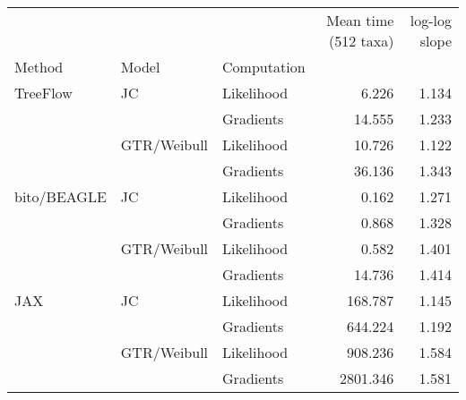 \begin{tabular}{lllrr}
\toprule
    &             &           &  Mean time (512 taxa) &  log-log slope \\
Method & Model & Computation &                       &                \\
\midrule
TreeFlow & JC & Likelihood &                 6.226 &          1.134 \\
    &             & Gradients &                14.555 &          1.233 \\
    & GTR/Weibull & Likelihood &                10.726 &          1.122 \\
    &             & Gradients &                36.136 &          1.343 \\
bito/BEAGLE & JC & Likelihood &                 0.162 &          1.271 \\
    &             & Gradients &                 0.868 &          1.328 \\
    & GTR/Weibull & Likelihood &                 0.582 &          1.401 \\
    &             & Gradients &                14.736 &          1.414 \\
JAX & JC & Likelihood &               168.787 &          1.145 \\
    &             & Gradients &               644.224 &          1.192 \\
    & GTR/Weibull & Likelihood &               908.236 &          1.584 \\
    &             & Gradients &              2801.346 &          1.581 \\
\bottomrule
\end{tabular}
